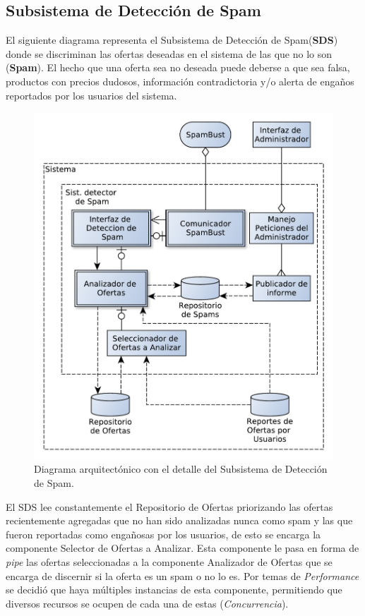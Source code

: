 \subsection{Subsistema de Detección de Spam}

El siguiente diagrama representa el Subsistema de Detección de Spam(\textbf{SDS}) donde se discriminan las ofertas deseadas en el sistema de las que no lo son (\textbf{Spam}). El hecho que una oferta sea no deseada puede deberse a que sea falsa, productos con precios dudosos, información contradictoria y/o alerta de enga\~{n}os reportados por los usuarios del sistema.

\begin{figure}[H]
	\centering
	\includegraphics[width=\textwidth]{graficos/arch/Sistema_deteccion_spam.pdf}
	\caption{Diagrama arquitectónico con el detalle del \textsf{Subsistema de Detección de Spam}.}
\end{figure}

El SDS lee constantemente el \textsf{Repositorio de Ofertas} priorizando las ofertas recientemente agregadas que no han sido analizadas nunca como spam y las que fueron reportadas como enga\~{n}osas por los usuarios, de esto se encarga la componente \textsf{Selector de Ofertas a Analizar}. Esta componente le pasa en forma de \emph{pipe} las ofertas seleccionadas a la componente \textsf{Analizador de Ofertas} que se encarga de discernir si la oferta es un spam o no lo es. Por temas de \emph{Performance} se decidió que haya múltiples instancias de esta componente, permitiendo que diversos recursos se ocupen de cada una de estas (\emph{Concurrencia}).\\

